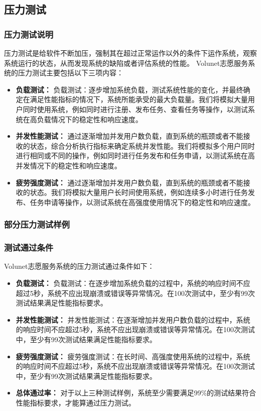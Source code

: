 \subsection{压力测试}
\subsubsection{压力测试说明}
压力测试是给软件不断加压，强制其在超过正常运作以外的条件下运作系统，观察系统运行的状态，从而发现系统的缺陷或者评估系统的性能。
Volunet志愿服务系统的压力测试主要包括以下三项内容：
\begin{itemize}[itemsep=2pt,topsep=0pt,parsep=4pt,itemindent=1em]
\item \textbf{负载测试：}
负载测试：逐步增加系统负载，测试系统性能的变化，并最终确定在满足性能指标的情况下，系统所能承受的最大负载量。我们将模拟大量用户同时使用系统，例如同时进行注册、发布任务、查看任务等操作，以测试系统在高负载情况下的稳定性和响应速度。
\item \textbf{并发性能测试：}
通过逐渐增加并发用户数负载，直到系统的瓶颈或者不能接收的状态，综合分析执行指标来确定系统并发性能。我们将模拟多个用户同时进行相同或不同的操作，例如同时进行任务发布和任务申请，以测试系统在高并发情况下的稳定性和响应速度。
\item \textbf{疲劳强度测试：}
通过逐渐增加并发用户数负载，直到系统的瓶颈或者不能接收的状态。我们将模拟大量用户长时间使用系统，例如连续多小时进行任务发布、任务申请等操作，以测试系统在高强度使用情况下的稳定性和响应速度。
\end{itemize}
\subsubsection{部分压力测试样例}

\subsubsection{测试通过条件}
Volunet志愿服务系统的压力测试通过条件如下：
\begin{itemize}
[itemsep=2pt,topsep=0pt,parsep=4pt,itemindent=1em]
\item \textbf{负载测试：}
负载测试：在逐步增加系统负载的过程中，系统的响应时间不应超过5秒，系统不应出现崩溃或错误等异常情况。在100次测试中，至少有99次测试结果满足性能指标要求。
\item \textbf{并发性能测试：}
并发性能测试：在逐渐增加并发用户数负载的过程中，系统的响应时间不应超过5秒，系统不应出现崩溃或错误等异常情况。在100次测试中，至少有99次测试结果满足性能指标要求。
\item \textbf{疲劳强度测试：}
疲劳强度测试：在长时间、高强度使用系统的过程中，系统的响应时间不应超过5秒，系统不应出现崩溃或错误等异常情况。在100次测试中，至少有99次测试结果满足性能指标要求。
\item \textbf{总体通过率：}
对于以上三种测试样例，系统至少需要满足99\%的测试结果符合性能指标要求，才能算通过压力测试。
\end{itemize}

